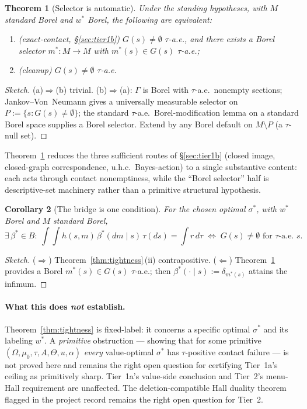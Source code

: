 \documentclass[11pt]{article}
\newtheorem{theorem}{Theorem}
\newtheorem{corollary}[theorem]{Corollary}
\theoremstyle{definition}
\theoremstyle{remark}
\newcommand{\Om}{\Omega}
\newcommand{\Th}{\Theta}
\begin{document}
\begin{theorem}[Selector is automatic]\label{thm:cleanup}
Under the standing hypotheses, with $M$ standard Borel and $w^*$
Borel, the following are equivalent:
\begin{enumerate}[leftmargin=2em,label=(\alph*)]
\item (exact-contact, \S\ref{sec:tier1b}) $G(s)\ne\emptyset$
$\tau$-a.e., and there exists a Borel selector $m^*:M\to M$ with
$m^*(s)\in G(s)$ $\tau$-a.e.;
\item (cleanup) $G(s)\ne\emptyset$ $\tau$-a.e.
\end{enumerate}
\end{theorem}

\begin{proof}[Sketch]
(a)$\Rightarrow$(b) trivial. (b)$\Rightarrow$(a): $\Gamma$ is Borel
with $\tau$-a.e.\ nonempty sections; Jankov--Von~Neumann gives a
universally measurable selector on $P := \{s : G(s)\ne\emptyset\}$;
the standard $\tau$-a.e.\ Borel-modification lemma on a standard
Borel space supplies a Borel selector. Extend by any Borel default
on $M\setminus P$ (a $\tau$-null set).
\end{proof}

Theorem~\ref{thm:cleanup} reduces the three sufficient routes of
\S\ref{sec:tier1b} (closed image, closed-graph correspondence, u.h.c.\
Bayes-action) to a single substantive content: each acts through
contact nonemptiness, while the ``Borel selector'' half is
descriptive-set machinery rather than a primitive structural
hypothesis.

\begin{corollary}[The bridge is one condition]\label{cor:bridge}
For the chosen optimal $\sigma^*$, with $w^*$ Borel and $M$ standard
Borel,
\[
  \exists\,\beta^*\in B:\
  \int\!\!\int h(s,m)\,\beta^*(dm\mid s)\,\tau(ds) = \int r\,d\tau
  \;\Longleftrightarrow\;
  G(s)\ne\emptyset \text{ for $\tau$-a.e.\ }s.
\]
\end{corollary}

\begin{proof}[Sketch]
($\Rightarrow$) Theorem~\ref{thm:tightness}\,(ii) contrapositive.
($\Leftarrow$) Theorem~\ref{thm:cleanup} provides a Borel
$m^*(s)\in G(s)$ $\tau$-a.e.; then
$\beta^*(\cdot\mid s) := \delta_{m^*(s)}$ attains the infimum.
\end{proof}

\paragraph{What this does \emph{not} establish.}
Theorem~\ref{thm:tightness} is fixed-label: it concerns a specific
optimal $\sigma^*$ and its labeling $w^*$. A \emph{primitive}
obstruction --- showing that for some primitive
$(\Om,\mu_0,\tau,A,\Th,u,\alpha)$ \emph{every} value-optimal
$\sigma^*$ has $\tau$-positive contact failure --- is not proved
here and remains the right open question for certifying Tier~1a's
ceiling as primitively sharp. Tier~1a's value-side conclusion and
Tier~2's menu-Hall requirement are unaffected. The
deletion-compatible Hall duality theorem flagged in the project
record remains the right open question for Tier~2.
\end{document}
